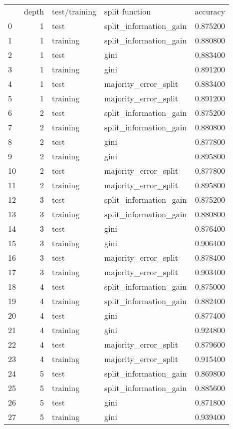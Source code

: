 \begin{tabular}{lrllr}
 & depth & test/training & split function & accuracy \\
0 & 1 & test & split_information_gain & 0.875200 \\
1 & 1 & training & split_information_gain & 0.880800 \\
2 & 1 & test & gini & 0.883400 \\
3 & 1 & training & gini & 0.891200 \\
4 & 1 & test & majority_error_split & 0.883400 \\
5 & 1 & training & majority_error_split & 0.891200 \\
6 & 2 & test & split_information_gain & 0.875200 \\
7 & 2 & training & split_information_gain & 0.880800 \\
8 & 2 & test & gini & 0.877800 \\
9 & 2 & training & gini & 0.895800 \\
10 & 2 & test & majority_error_split & 0.877800 \\
11 & 2 & training & majority_error_split & 0.895800 \\
12 & 3 & test & split_information_gain & 0.875200 \\
13 & 3 & training & split_information_gain & 0.880800 \\
14 & 3 & test & gini & 0.876400 \\
15 & 3 & training & gini & 0.906400 \\
16 & 3 & test & majority_error_split & 0.878400 \\
17 & 3 & training & majority_error_split & 0.903400 \\
18 & 4 & test & split_information_gain & 0.875000 \\
19 & 4 & training & split_information_gain & 0.882400 \\
20 & 4 & test & gini & 0.877400 \\
21 & 4 & training & gini & 0.924800 \\
22 & 4 & test & majority_error_split & 0.879600 \\
23 & 4 & training & majority_error_split & 0.915400 \\
24 & 5 & test & split_information_gain & 0.869800 \\
25 & 5 & training & split_information_gain & 0.885600 \\
26 & 5 & test & gini & 0.871800 \\
27 & 5 & training & gini & 0.939400 \\

\end{tabular}
